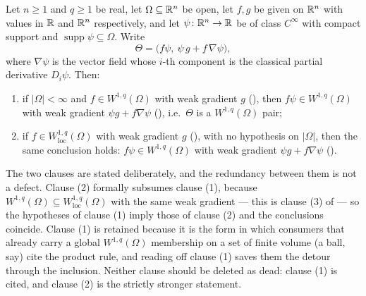 \begin{lemma}
Let $n\ge1$ and $q\ge1$ be real, let $\Omega\subseteq\mathbb{R}^n$ be open, let
$f,g$ be given on $\mathbb{R}^n$ with values in $\mathbb{R}$ and $\mathbb{R}^n$ respectively, and let
$\psi\colon\mathbb{R}^n\to\mathbb{R}$ be of class $C^\infty$ with compact support and
$\operatorname{supp}\psi\subseteq\Omega$.  Write
\[
\Theta=\bigl(f\psi,\ \psi\,g+f\,\nabla\psi\bigr),
\]
where $\nabla\psi$ is the vector field whose $i$-th component is the classical
partial derivative $D_i\psi$.  Then:
\begin{enumerate}
\item if $|\Omega|<\infty$ and $f\in W^{1,q}(\Omega)$ with weak gradient $g$
  (), then $f\psi\in W^{1,q}(\Omega)$ with weak gradient
  $\psi g+f\nabla\psi$ (), i.e.\ $\Theta$ is a
  $W^{1,q}(\Omega)$ pair;
\item if $f\in W^{1,q}_{\mathrm{loc}}(\Omega)$ with weak gradient $g$
  (), with no hypothesis on $|\Omega|$, then the same
  conclusion holds: $f\psi\in W^{1,q}(\Omega)$ with weak gradient
  $\psi g+f\nabla\psi$ ().
\end{enumerate}
The two clauses are stated deliberately, and the redundancy between them is not
a defect.  Clause (2) formally subsumes clause (1), because
$W^{1,q}(\Omega)\subseteq W^{1,q}_{\mathrm{loc}}(\Omega)$ with the same weak
gradient --- this is clause (3) of  --- so the
hypotheses of clause (1) imply those of clause (2) and the conclusions
coincide.  Clause (1) is retained because it is the form in which consumers
that already carry a global $W^{1,q}(\Omega)$ membership on a set of finite
volume (a ball, say) cite the product rule, and reading off clause (1) saves
them the detour through the inclusion.  Neither clause should be deleted as
dead: clause (1) is cited, and clause (2) is the strictly stronger statement.
\end{lemma}
